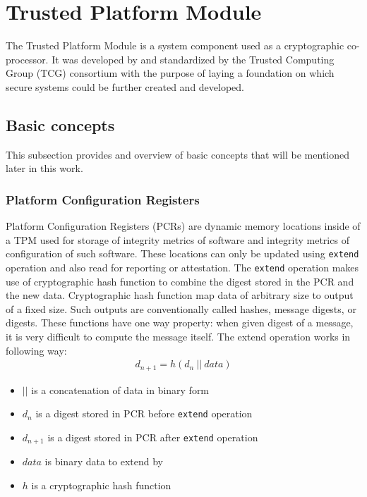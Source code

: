 \chapter{Trusted Platform Module}
The Trusted Platform Module is a system component used as a cryptographic co-processor. It was developed by and standardized by the Trusted Computing Group (TCG) consortium with the purpose of laying a foundation on which secure systems could be further created and developed. 

\section{Basic concepts}
This subsection provides and overview of basic concepts that will be mentioned later in this work.

\subsection{Platform Configuration Registers}
Platform Configuration Registers (PCRs) are dynamic memory locations inside of a TPM used for storage of integrity metrics of software and integrity metrics of configuration of such software. These locations can only be updated using \texttt{extend} operation and also read for reporting or attestation. The \texttt{extend} operation makes use of cryptographic hash function to combine the digest stored in the PCR and the new data. Cryptographic hash function map data of arbitrary size to output of a fixed size. Such outputs are conventionally called hashes, message digests, or digests. These functions have one way property: when given digest of a message, it is very difficult to compute the message itself. The extend operation works in following way:
\begin{align*}
    d_{n+1} = h(d_{n}\ ||\ data)
\end{align*}
\begin{itemize}
    \item $||$ is a concatenation of data in binary form
    \item $ d_{n} $ is a digest stored in PCR before \texttt{extend} operation
    \item $ d_{n+1} $ is a digest stored in PCR after \texttt{extend} operation
    \item $ data $ is binary data to extend by
    \item $ h $ is a cryptographic hash function
\end{itemize}

